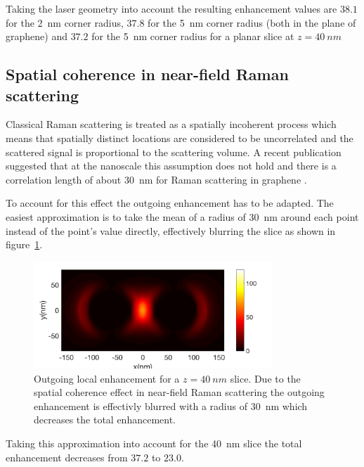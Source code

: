 Taking the laser geometry into account the resulting enhancement values are $38.1$ for the \SI{2}{nm} corner radius, $37.8$ for the \SI{5}{nm} corner radius (both in the plane of graphene) and $37.2$ for the \SI{5}{nm} corner radius for a planar slice at $z=\SI{40}{nm}$ 

\subsection{Spatial coherence in near-field Raman scattering}

Classical Raman scattering is treated as a spatially incoherent process which means that spatially distinct locations are considered to be uncorrelated and the scattered signal is proportional to the scattering volume. A recent publication suggested that at the nanoscale this assumption does not hold and there is a correlation length of about \SI{30}{nm} for Raman scattering in graphene \cite{coherence}.

To account for this effect the outgoing enhancement has to be adapted. The easiest approximation is to take the mean of a radius of \SI{30}{nm} around each point instead of the point's value directly, effectively blurring the slice as shown in figure~\ref{fig:coherence}. 

\begin{figure}[!h]
  \centering
  \includegraphics[width=0.8\textwidth]{./images/coherence.png}
  \caption{Outgoing local enhancement for a $z=\SI{40}{nm}$ slice. Due to the spatial coherence effect in near-field Raman scattering the outgoing enhancement is effectivly blurred with a radius of \SI{30}{nm} which decreases the total enhancement.}
  \label{fig:coherence}
\end{figure}

Taking this approximation into account for the \SI{40}{nm} slice the total enhancement decreases from $37.2$ to $23.0$. 
